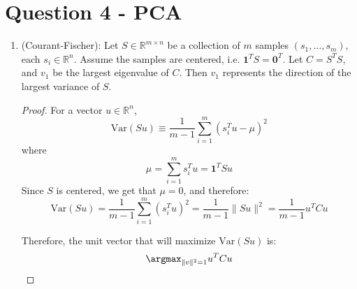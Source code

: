 \documentclass{article}
\begin{document}
\section*{Question 4 - PCA}
\begin{enumerate}[label=\textbf{\large\arabic*)}]

  \item 
\begin{claim}
(Courant-Fischer): Let $S \in \mathbb{R}^{m \times n}$ be a collection of $m$ samples $(s_1, \ldots, s_m)$, each $s_i \in \mathbb{R}^{n}$. 
  Assume the samples are centered, i.e. $\bm{1}^{T} S = \bm{0}^{T}$.  
Let $C = S ^{T}S$, and $v_1$ be the largest eigenvalue of $C$. Then $v_1$ represents the direction of the largest variance of $S$. 
\end{claim}

\begin{proof} For a vector $u \in \mathbb{R}^{n}$, 
\[
  \text{Var}(Su) \equiv \frac{1}{m-1} \sum_{i=1}^{m} (s_i ^{T} u- \mu) ^2
\]
    where
    \[
      \mu = \sum_{i=1}^{m} s_i ^{T} u = \bm{1}^{T}Su
    \]
   Since $S$ is centered, we get that $\mu=0$, and therefore:
    \[
      \text{Var}(Su) = \frac{1}{m-1} \sum_{i=1}^{m} (s_i ^{T} u) ^2 = \frac{1}{m-1} \lVert Su \rVert ^2 = \frac{1}{m-1} u ^{T} C u
    \]
    

    Therefore, the unit vector that will maximize $\text{Var}(Su)$ is: 
    \[
      \argmax_{\lVert v \rVert ^2 =1} u^{T} C u
    \]
    


\end{proof}
\end{enumerate}
\end{document}
